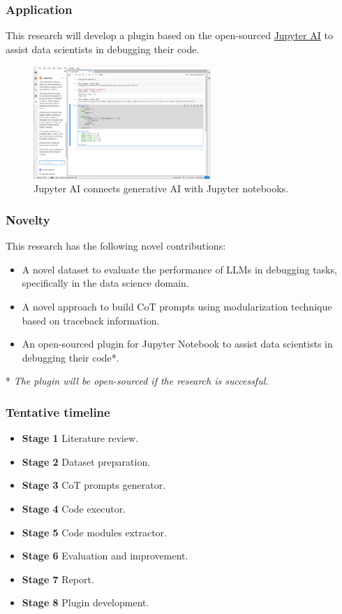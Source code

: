 \documentclass{beamer}
\newcounter{cont}
\begin{document}
\begin{frame}[allowframebreaks]
\frametitle{Application}
This research will develop a plugin based on the open-sourced \href{https://github.com/jupyterlab/jupyter-ai?tab=readme-ov-file}{Jupyter AI} to assist data scientists in debugging their code.
  \begin{figure}
    \centering
    \includegraphics[width=0.6\textwidth]{img/jupyter_ai_screenshot.png}
    \caption{Jupyter AI connects generative AI with Jupyter notebooks.}
  \end{figure}
\end{frame}

\begin{frame}[allowframebreaks]
\frametitle{Novelty}
This research has the following novel contributions:
  \begin{itemize}
    \item A novel dataset to evaluate the performance of LLMs in debugging tasks, specifically in the data science domain.
    \item A novel approach to build CoT prompts using modularization technique based on traceback information.
    \item An open-sourced plugin for Jupyter Notebook to assist data scientists in debugging their code*.
  \end{itemize}
  * \textit{The plugin will be open-sourced if the research is successful.}
\end{frame}

\begin{frame}[allowframebreaks]
\frametitle{Tentative timeline}
  \begin{itemize}
    \item \textbf{Stage 1} Literature review.
    \item \textbf{Stage 2} Dataset preparation.
    \item \textbf{Stage 3} CoT prompts generator.
    \item \textbf{Stage 4} Code executor.
    \item \textbf{Stage 5} Code modules extractor.
    \item \textbf{Stage 6} Evaluation and improvement.
    \item \textbf{Stage 7} Report.
    \item \textbf{Stage 8} Plugin development.
  \end{itemize}
\end{frame}
\end{document}
